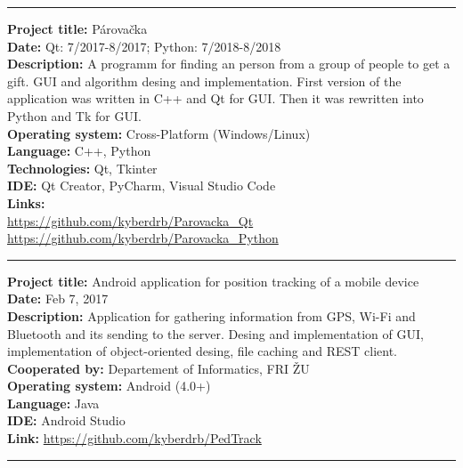 \documentclass[slovak]{article}
\begin{document}
\begin{center}\rule{3in}{0.4pt}\end{center}

\noindent
\textbf{Project title:} Párovačka\\
\textbf{Date:} Qt: 7/2017-8/2017; Python: 7/2018-8/2018\\
\textbf{Description:} A programm for finding an person from a group of people to get a gift. GUI and algorithm desing and implementation. First version of the application was written in C++ and Qt for GUI. Then it was rewritten into Python and Tk for GUI.\\
\textbf{Operating system:} Cross-Platform (Windows/Linux)\\
\textbf{Language:} C++, Python\\
\textbf{Technologies:} Qt, Tkinter\\
\textbf{IDE:} Qt Creator, PyCharm, Visual Studio Code\\
\textbf{Links:}\\
\href{https://github.com/kyberdrb/Parovacka\_Qt}{https://github.com/kyberdrb/Parovacka\_Qt}\\
\href{https://github.com/kyberdrb/Parovacka\_Python}{https://github.com/kyberdrb/Parovacka\_Python}

\begin{center}\rule{3in}{0.4pt}\end{center}

\noindent
\textbf{Project title:} Android application for position tracking of a mobile device\\
\textbf{Date:} Feb 7, 2017\\
\textbf{Description:} Application for gathering information from GPS, Wi-Fi and Bluetooth and its sending to the server. Desing and implementation of GUI, implementation of object-oriented desing, file caching and REST client.\\
\textbf{Cooperated by:} Departement of Informatics, FRI ŽU\\
\textbf{Operating system:} Android (4.0+)\\
\textbf{Language:} Java\\
\textbf{IDE:} Android Studio\\
\textbf{Link:} \href{https://github.com/kyberdrb/PedTrack}{https://github.com/kyberdrb/PedTrack}

\begin{center}\rule{3in}{0.4pt}\end{center}
\end{document}
